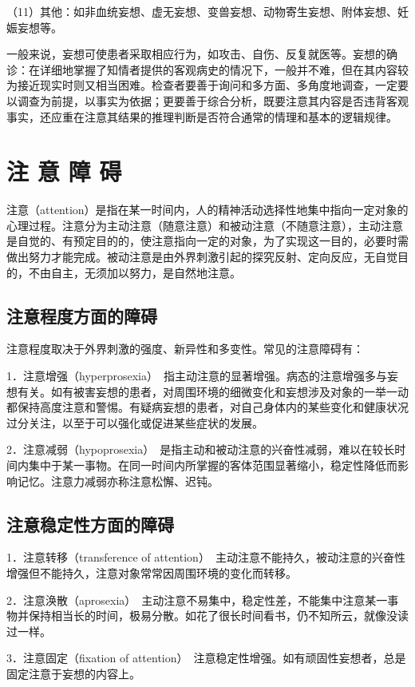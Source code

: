 （11）其他：如非血统妄想、虚无妄想、变兽妄想、动物寄生妄想、附体妄想、妊娠妄想等。

一般来说，妄想可使患者采取相应行为，如攻击、自伤、反复就医等。妄想的确诊：在详细地掌握了知情者提供的客观病史的情况下，一般并不难，但在其内容较为接近现实时则又相当困难。检查者要善于询问和多方面、多角度地调查，一定要以调查为前提，以事实为依据；更要善于综合分析，既要注意其内容是否违背客观事实，还应重在注意其结果的推理判断是否符合通常的情理和基本的逻辑规律。

\section{注 意 障 碍}

注意（attention）是指在某一时间内，人的精神活动选择性地集中指向一定对象的心理过程。注意分为主动注意（随意注意）和被动注意（不随意注意），主动注意是自觉的、有预定目的的，使注意指向一定的对象，为了实现这一目的，必要时需做出努力才能完成。被动注意是由外界刺激引起的探究反射、定向反应，无自觉目的，不由自主，无须加以努力，是自然地注意。

\subsection{注意程度方面的障碍}

注意程度取决于外界刺激的强度、新异性和多变性。常见的注意障碍有：

1．注意增强（hyperprosexia）　指主动注意的显著增强。病态的注意增强多与妄想有关。如有被害妄想的患者，对周围环境的细微变化和妄想涉及对象的一举一动都保持高度注意和警惕。有疑病妄想的患者，对自己身体内的某些变化和健康状况过分关注，以至于可以强化或促进某些症状的发展。

2．注意减弱（hypoprosexia）　是指主动和被动注意的兴奋性减弱，难以在较长时间内集中于某一事物。在同一时间内所掌握的客体范围显著缩小，稳定性降低而影响记忆。注意力减弱亦称注意松懈、迟钝。

\subsection{注意稳定性方面的障碍}

1．注意转移（transference of
attention）　主动注意不能持久，被动注意的兴奋性增强但不能持久，注意对象常常因周围环境的变化而转移。

2．注意涣散（aprosexia）　主动注意不易集中，稳定性差，不能集中注意某一事物并保持相当长的时间，极易分散。如花了很长时间看书，仍不知所云，就像没读过一样。

3．注意固定（fixation of
attention）　注意稳定性增强。如有顽固性妄想者，总是固定注意于妄想的内容上。

